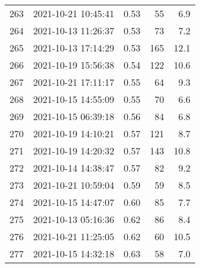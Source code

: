 \begin{tabular}{llrrr}
263 & 2021-10-21 10:45:41 &  0.53 &              55 &                    6.9 \\
264 & 2021-10-13 11:26:37 &  0.53 &              73 &                    7.2 \\
265 & 2021-10-13 17:14:29 &  0.53 &             165 &                   12.1 \\
266 & 2021-10-19 15:56:38 &  0.54 &             122 &                   10.6 \\
267 & 2021-10-21 17:11:17 &  0.55 &              64 &                    9.3 \\
268 & 2021-10-15 14:55:09 &  0.55 &              70 &                    6.6 \\
269 & 2021-10-15 06:39:18 &  0.56 &              84 &                    6.8 \\
270 & 2021-10-19 14:10:21 &  0.57 &             121 &                    8.7 \\
271 & 2021-10-19 14:20:32 &  0.57 &             143 &                   10.8 \\
272 & 2021-10-14 14:38:47 &  0.57 &              82 &                    9.2 \\
273 & 2021-10-21 10:59:04 &  0.59 &              59 &                    8.5 \\
274 & 2021-10-15 14:47:07 &  0.60 &              85 &                    7.7 \\
275 & 2021-10-13 05:16:36 &  0.62 &              86 &                    8.4 \\
276 & 2021-10-21 11:25:05 &  0.62 &              60 &                   10.5 \\
277 & 2021-10-15 14:32:18 &  0.63 &              58 &                    7.0 \\
\bottomrule
\end{tabular}
